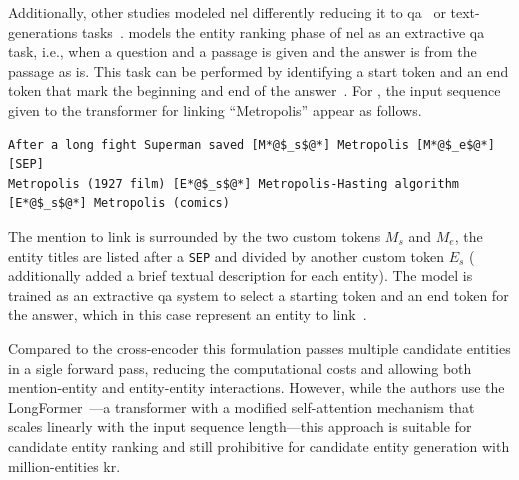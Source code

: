 Additionally, other studies modeled \ac{nel} differently reducing it to \ac{qa}~\cite{barba-etal-2022-extend,procopio-etal-2023-entity,zhang2022entqa} or text-generations tasks~\cite{decao2021autoregressive}.
\textcite{procopio-etal-2023-entity} models the entity ranking phase of \ac{nel} as an extractive \acl{qa} task, i.e., when a question and a passage is given and the answer is  from the passage as is. This task can be performed by identifying a start token and an end token that mark the beginning and end of the answer~\cite{barba-etal-2022-extend}.
For \textcite{procopio-etal-2023-entity}, the input sequence given to the transformer for linking ``Metropolis'' appear as follows.
\begin{lstlisting}
After a long fight Superman saved [M*@$_s$@*] Metropolis [M*@$_e$@*] [SEP]
Metropolis (1927 film) [E*@$_s$@*] Metropolis-Hasting algorithm [E*@$_s$@*] Metropolis (comics)
\end{lstlisting}
The mention to link is surrounded by the two custom tokens $M_s$ and $M_e$, the entity titles are listed after a \texttt{SEP} and divided by another custom token $E_s$ (\textcite{procopio-etal-2023-entity} additionally added a brief textual description for each entity). The model is trained as an extractive \ac{qa} system to select a starting token and an end token for the answer, which in this case represent an entity to link~\cite{barba-etal-2022-extend}.

Compared to the cross-encoder this formulation passes multiple candidate entities in a sigle forward pass, reducing the computational costs and allowing both mention-entity and entity-entity interactions.
However, while the authors use the LongFormer~\cite{beltagy2020longformerlongdocumenttransformer}---a transformer with a modified self-attention mechanism that scales linearly with the input sequence length---this approach is suitable for candidate entity ranking and still prohibitive for candidate entity generation with million-entities \ac{kr}. 

